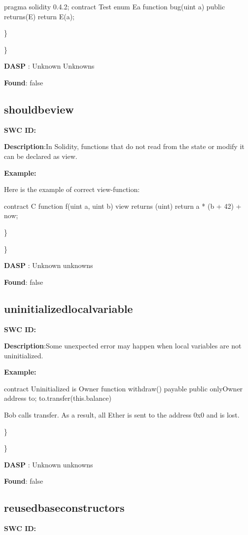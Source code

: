 \documentclass{article}
\begin{document}
{{pragma solidity 0.4.2;
contract Test{
  enum E{a}
  function bug(uint a) public returns(E){
        return E(a);
    }
}

\} 

\} 

\textbf{DASP} : Unknown Unknowns

\textbf{Found}: false

\subsection{should\textunderscore be\textunderscore view} 
\textbf{SWC \textunderscore ID:} 

\textbf{Description}:In Solidity, functions that do not read from the state or modify it can be declared as view.


\textbf{Example:} 

Here is the example of correct view-function:

contract C {
    function f(uint a, uint b) view returns (uint) {
        return a * (b + 42) + now;
    }
}

\} 

\} 

\textbf{DASP} : Unknown unknowns

\textbf{Found}: false

\subsection{uninitialized\textunderscore local\textunderscore variable} 
\textbf{SWC \textunderscore ID:} 

\textbf{Description}:Some unexpected error may happen when local variables are not uninitialized.


\textbf{Example:} 

contract Uninitialized is Owner{
    function withdraw() payable public onlyOwner{
        address to;
        to.transfer(this.balance)
    }
}

Bob calls transfer. As a result, all Ether is sent to the address 0x0 and is lost.

\} 

\} 

\textbf{DASP} : Unknown unknowns

\textbf{Found}: false

\subsection{reused\textunderscore base\textunderscore constructors} 
\textbf{SWC \textunderscore ID:} 

}}
\end{document}
